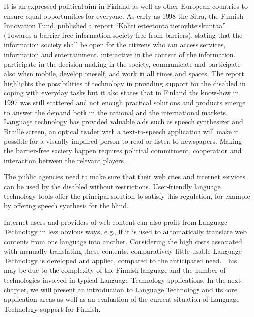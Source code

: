 \documentclass[]{../../metanetpaper}
\begin{document}
\begin{Parallel}[c]{77mm}{77mm}
{It is an expressed political aim in Finland as well as other European
countries to ensure equal opportunities for everyone. As early as 1998
the Sitra, the Finnish Innovation Fund, published a report “Kohti
esteetöntä tietoyhteiskuntaa” (Towards a barrier-free information
society free from barriers), stating that the information society
shall be open for the citizens who can access services, information
and entertainment, interactive in the content of the information,
participate in the decision making in the society, communicate and
participate also when mobile, develop oneself, and work in all times
and spaces. The report highlights the possibilities of technology in
providing support for the disabled in coping with everyday tasks but
it also states that in Finland the know-how in 1997 was still
scattered and not enough practical solutions and products emerge to
answer the demand both in the national and the international
markets. Language technology has provided valuable aids such as speech
synthesizer and Braille screen, an optical reader with a
text-to-speech application will make it possible for a visually
impaired person to read or listen to newspapers. Making the
barrier-free society happen requires political commitment, cooperation
and interaction between the relevant players \cite{Sitra1998}.

The public agencies need to make sure that their web sites and internet
services can be used by the disabled without restrictions. User-friendly
language technology tools offer the principal solution to satisfy this
regulation, for example by offering speech synthesis for the blind.

Internet users and providers of web content can also profit from
Language Technology in less obvious ways, e.g., if it is used to
automatically translate web contents from one language into
another. Considering the high costs associated with manually
translating these contents, comparatively little usable Language
Technology is developed and applied, compared to the anticipated
need. This may be due to the complexity of the Finnish language and
the number of technologies involved in typical Language Technology
applications. In the next chapter, we will present an introduction to
Language Technology and its core application areas as well as an
evaluation of the current situation of Language Technology support for
Finnish.
}

\ParallelPar

\clearpage




\end{Parallel}
\end{document}
